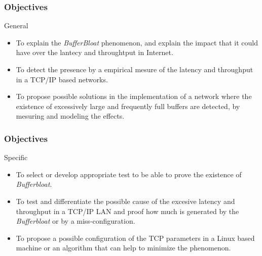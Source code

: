 \documentclass{beamer}
\begin{document}
\begin{frame}
\frametitle{Objectives}
\begin{block}{General}
\begin{center}
\begin{itemize}
\item To explain the \textit{BufferBloat} phenomenon, and explain the impact that it could have over the lantecy and throughtput in Internet.
\item To detect the presence by a empirical mesure of the latency and throughput in a TCP/IP based networks.
\item To propose possible solutions in the implementation of a network where the existence of excessively large and frequently full buffers are detected, by mesuring and modeling the effects.
\end{itemize}
\end{center}
\end{block}
\end{frame}
%
\begin{frame}
\frametitle{Objectives}
\begin{block}{Specific}
\begin{center}
\begin{itemize}
\item To select or develop appropriate test to be able to prove the existence of \textit{Bufferbloat}.
\item To test and differentiate the possible cause of the excesive latency and throughput in a TCP/IP LAN and proof how much is generated by the \textit{Bufferbloat} or by a miss-configuration.
\item To propose a possible configuration of the TCP parameters in a Linux based machine or an algorithm that can help to minimize the phenomenon.
\end{itemize}
\end{center}
\end{block}
\end{frame}
%
\end{document}
